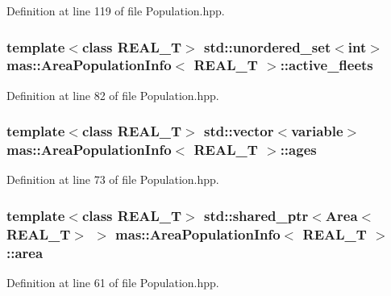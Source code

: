 Definition at line 119 of file Population.\-hpp.

\hypertarget{structmas_1_1_area_population_info_ad455e6e80920b7712afeb51d644efde0}{
\subsubsection[{active\-\_\-fleets}]{\setlength{\rightskip}{0pt plus 5cm}template$<$class R\-E\-A\-L\-\_\-\-T$>$ std\-::unordered\-\_\-set$<$int$>$ {\bf mas\-::\-Area\-Population\-Info}$<$ R\-E\-A\-L\-\_\-\-T $>$\-::active\-\_\-fleets}}\label{structmas_1_1_area_population_info_ad455e6e80920b7712afeb51d644efde0}


Definition at line 82 of file Population.\-hpp.

\hypertarget{structmas_1_1_area_population_info_a4849fa1ac89280ac40ae053fc2c1facf}{
\subsubsection[{ages}]{\setlength{\rightskip}{0pt plus 5cm}template$<$class R\-E\-A\-L\-\_\-\-T$>$ std\-::vector$<${\bf variable}$>$ {\bf mas\-::\-Area\-Population\-Info}$<$ R\-E\-A\-L\-\_\-\-T $>$\-::ages}}\label{structmas_1_1_area_population_info_a4849fa1ac89280ac40ae053fc2c1facf}


Definition at line 73 of file Population.\-hpp.

\hypertarget{structmas_1_1_area_population_info_a6f1983de42fde246cfc0381467ca7213}{
\subsubsection[{area}]{\setlength{\rightskip}{0pt plus 5cm}template$<$class R\-E\-A\-L\-\_\-\-T$>$ std\-::shared\-\_\-ptr$<${\bf Area}$<$R\-E\-A\-L\-\_\-\-T$>$ $>$ {\bf mas\-::\-Area\-Population\-Info}$<$ R\-E\-A\-L\-\_\-\-T $>$\-::area}}\label{structmas_1_1_area_population_info_a6f1983de42fde246cfc0381467ca7213}


Definition at line 61 of file Population.\-hpp.


